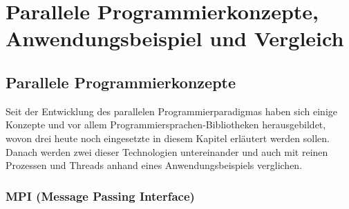 
\chapter{Parallele Programmierkonzepte, Anwendungsbeispiel und Vergleich}

	\section{Parallele Programmierkonzepte}
		\label{ParalleleProgrammierkonzepte}
	
		Seit der Entwicklung des parallelen Programmierparadigmas haben sich einige Konzepte und vor allem Programmiersprachen-Bibliotheken herausgebildet, wovon drei heute noch eingesetzte in diesem Kapitel erläutert werden sollen. Danach werden zwei dieser Technologien untereinander und auch mit reinen Prozessen und Threads anhand eines Anwendungsbeispiels verglichen.
		
		\subsection{MPI (Message Passing Interface)}
			\label{MPI}

